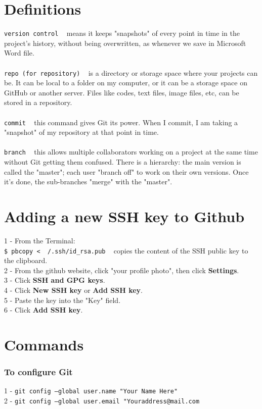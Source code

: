 \documentclass{article}
\begin{document}
{{\section{Definitions}
\texttt{version control} ~ means it keeps "snapshots" of every point in time in the project's history, without being overwritten, as whenever we save in Microsoft Word file.\\
\\
\texttt{repo (for repository)} ~ is a directory or storage space where your projects can be. It can be local to a folder on my computer, or it can be a storage space on GitHub or another server. Files like codes, text files, image files, etc, can be stored in a repository. \\
\\
\texttt{commit} ~ this command gives Git its power. When I commit, I am taking a "snapshot" of my repository at that point in time.\\
\\
\texttt{branch} ~ this allows multiple collaborators working on a project at the same time without Git getting them confused. There is a hierarchy: the main version is called the "master"; each user "branch off" to work on their own versions. Once it's done, the sub-branches "merge" with the "master". \\


\section{Adding a new SSH key to Github}
1 - From the Terminal:\\
\texttt{\$ pbcopy < ~/.ssh/id\_rsa.pub} ~ copies the content of the SSH public key to the clipboard. \\
2 - From the github website, click "your profile photo", then click \textbf{Settings}.\\
3 - Click \textbf{SSH and GPG keys}.\\
4 - Click \textbf{New SSH key} or \textbf{Add SSH key}.\\
5 - Paste the key into the "Key" field.\\
6 - Click \textbf{Add SSH key}.\\

\section{Commands}
\subsubsection{To configure Git}
1 - \texttt{git config --global user.name "Your Name Here"} \\
2 - \texttt{git config --global user.email "Youraddress@mail.com}\\

}}
\end{document}
